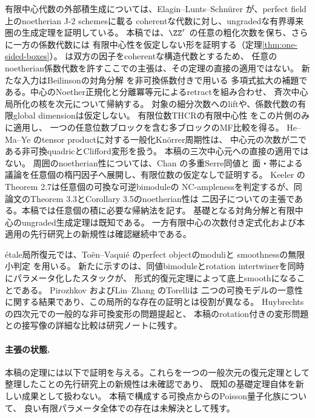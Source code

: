 有限中心代数の外部積生成については、Elagin--Lunts--Schn\"urer
\cite[Theorem 4.18]{ELS} が、perfect field上のnoetherian J-2 schemesに載る
coherentな代数に対し、ungradedな有界導来圏の生成定理を証明している。
本稿では、\(\ZZ^r\) の任意の粗化次数を保ち、さらに一方の係数代数には
有限中心性を仮定しない形を証明する（定理\ref{thm:one-sided-boxes}）。
\cite[Theorem 4.18]{ELS} は双方の因子をcoherentな構造代数とするため、
任意のnoetherian係数代数を許すここでの主張は、その定理の直接の適用ではない。
新たな入力はBeilinsonの対角分解 \cite{Beilinson} を非可換係数付きで用いる
多項式拡大の補題である。中心のNoether正規化と分離冪等元によるretractを組み合わせ、
斉次中心局所化の核を次元について帰納する。
対象の細分次数へのliftや、係数代数の有限global dimensionは仮定しない。
有限位数THCRの有限中心性 \cite[Corollary 2.3]{SmithTate} をこの片側のみに適用し、
一つの任意位数ブロックを含む多ブロックのMF比較を得る。
He--Ma--Ye \cite{HMY} のtensor productに対する一般化Kn\"orrer周期性は、
中心元の次数が二である非可換quadricとClifford変形を扱う。
本稿の三次中心元への直接の適用ではない。
周囲のnoetherian性については、Chan \cite{ChanMulti} の多重Serre同値と
面・帯による議論を任意個の楕円因子へ展開し、有限位数の仮定なしで証明する。
Keeler \cite{KeelerMulti} のTheorem 2.7は任意個の可換な可逆bimoduleの
NC-amplenessを判定するが、同論文のTheorem 3.3とCorollary 3.5のnoetherian性は
二因子についての主張である。本稿では任意個の積に必要な帰納法を記す。
基礎となる対角分解と有限中心のungraded生成定理は既知である。
一方有限中心の次数付き定式化および本適用の先行研究上の新規性は確認継続中である。

étale局所復元では、Toën--Vaquié \cite{TV} のperfect objectのmoduliと
smoothnessの無限小判定 \cite{Stacks} を用いる。
新たに示すのは、同値bimoduleとrotation intertwinerを同時にパラメータ化したスタックが、
形式的復元定理によって底上smoothになることである。
Pirozhkov \cite{Pirozhkov} およびLin--Zhang \cite{LZ} のTorelliは
二つの可換モデルの一意性に関する結果であり、この局所的な存在の証明とは役割が異なる。
Huybrechts \cite[Section 9]{HuyUpdate} の四次元での一般的な非可換変形の問題提起と、
本稿のrotation付きの変形問題との接写像の詳細な比較は研究ノートに残す。

\paragraph{主張の状態.}
本稿の定理には以下で証明を与える。これらを一つの一般次元の復元定理として
整理したことの先行研究上の新規性は未確認であり、
既知の基礎定理自体を新しい成果として扱わない。
本稿で構成する可換点からのPoisson量子化族について、
良い有限パラメータ全体での存在は未解決として残す。

